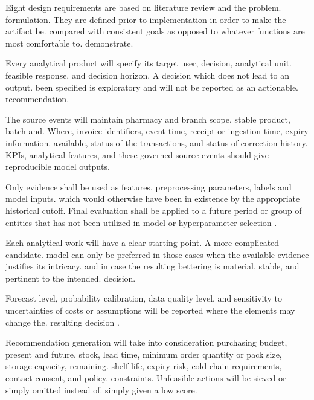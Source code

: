 \documentclass[a4paper,11pt,oneside]{book}
\theoremstyle{plain}
\theoremstyle{definition}
\theoremstyle{remark}
\begin{document}
Eight design requirements are based on literature review and the problem. formulation. They are defined prior to implementation in order to make the artifact be. compared with consistent goals as opposed to whatever functions are most comfortable to. demonstrate.

\begin{description}[style=nextline,leftmargin=2em]
    \item[DR1: Decision relevance]
    Every analytical product will specify its target user, decision, analytical unit. feasible response, and decision horizon. A decision which does not lead to an output. been specified is exploratory and will not be reported as an actionable. recommendation.

    \item[DR2: Operational integrity]
    The source events will maintain pharmacy and branch scope, stable product, batch and. Where, invoice identifiers, event time, receipt or ingestion time, expiry information. available, status of the transactions, and status of correction history. KPIs, analytical features, and these governed source events should give reproducible model outputs.

    \item[DR3: Temporal validity]
    Only evidence shall be used as features, preprocessing parameters, labels and model inputs. which would otherwise have been in existence by the appropriate historical cutoff. Final evaluation shall be applied to a future period or group of entities that has not been utilized in model or hyperparameter selection \cite{kaufman2012leakage}.

    \item[DR4: Proportionate modelling]
    Each analytical work will have a clear starting point. A more complicated candidate. model can only be preferred in those cases when the available evidence justifies its intricacy. and in case the resulting bettering is material, stable, and pertinent to the intended. decision.

    \item[DR5: Uncertainty and reliability]
    Forecast level, probability calibration, data quality level, and sensitivity to uncertainties of costs or assumptions will be reported where the elements may change the. resulting decision \cite{niculescu2005calibration}.

    \item[DR6: Feasible and responsible action]
    Recommendation generation will take into consideration purchasing budget, present and future. stock, lead time, minimum order quantity or pack size, storage capacity, remaining. shelf life, expiry risk, cold chain requirements, contact consent, and policy. constraints. Unfeasible actions will be sieved or simply omitted instead of. simply given a low score.


\end{description}
\end{document}
